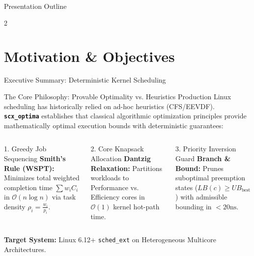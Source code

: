 \documentclass{beamer}
\begin{document}
\begin{frame}{Presentation Outline}
\begin{multicols}{2}
  \tableofcontents
\end{multicols}
\end{frame}

\section{Motivation \& Objectives}

\begin{frame}{Executive Summary: Deterministic Kernel Scheduling}
  \begin{block}{The Core Philosophy: Provable Optimality vs. Heuristics}
    \footnotesize
    Production Linux scheduling has historically relied on ad-hoc heuristics (CFS/EEVDF). \textbf{\texttt{scx\_optima}} establishes that classical algorithmic optimization principles provide mathematically optimal execution bounds with deterministic guarantees:
  \end{block}

  \vspace{0.1cm}
  \begin{columns}[T]
      \begin{block}{\tiny 1. Greedy Job Sequencing}
        \fontsize{6.5pt}{7.5pt}\selectfont
        \textbf{Smith's Rule (WSPT):} Minimizes total weighted completion time $\sum w_i C_i$ in $\mathcal{O}(n \log n)$ via task density $\rho_i = \frac{w_i}{p_i}$.
      \end{block}
      \begin{alertblock}{\tiny 2. Core Knapsack Allocation}
        \fontsize{6.5pt}{7.5pt}\selectfont
        \textbf{Dantzig Relaxation:} Partitions workloads to Performance vs. Efficiency cores in $\mathcal{O}(1)$ kernel hot-path time.
      \end{alertblock}
      \begin{exampleblock}{\tiny 3. Priority Inversion Guard}
        \fontsize{6.5pt}{7.5pt}\selectfont
        \textbf{Branch \& Bound:} Prunes suboptimal preemption states ($LB(c) \ge UB_{\text{best}}$) with admissible bounding in $<20\text{ns}$.
      \end{exampleblock}
  \end{columns}

  \vspace{0.15cm}
  \begin{center}
    \scriptsize
    \textbf{Target System:} Linux 6.12+ \texttt{sched\_ext} on Heterogeneous Multicore Architectures.
  \end{center}
\end{frame}
\end{document}
